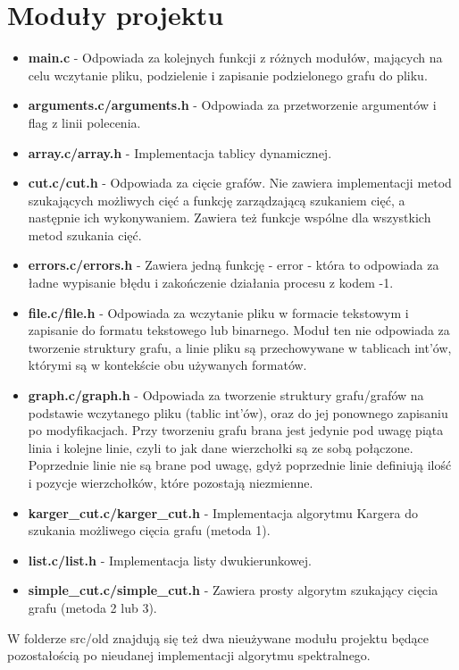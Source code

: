 \documentclass{article}
\begin{document}
\section{Moduły projektu}
\begin{itemize}
    \item \textbf{main.c} - Odpowiada za kolejnych funkcji z różnych modułów, mających na celu wczytanie pliku, podzielenie i zapisanie podzielonego grafu do pliku.
    \item \textbf{arguments.c/arguments.h} - Odpowiada za przetworzenie argumentów i flag z linii polecenia.
    \item \textbf{array.c/array.h} - Implementacja tablicy dynamicznej.
    \item \textbf{cut.c/cut.h} - Odpowiada za cięcie grafów. Nie zawiera implementacji metod szukających możliwych cięć a funkcję zarządzającą szukaniem cięć, a następnie ich wykonywaniem. Zawiera też funkcje wspólne dla wszystkich metod szukania cięć.
    \item \textbf{errors.c/errors.h} - Zawiera jedną funkcję - error - która to odpowiada za ładne wypisanie błędu i zakończenie działania procesu z kodem -1.
    \item \textbf{file.c/file.h} - Odpowiada za wczytanie pliku w formacie tekstowym i zapisanie do formatu tekstowego lub binarnego. Moduł ten nie odpowiada za tworzenie struktury grafu, a linie pliku są przechowywane w tablicach int'ów, którymi są w kontekście obu używanych formatów.
    \item \textbf{graph.c/graph.h} - Odpowiada za tworzenie struktury grafu/grafów na podstawie wczytanego pliku (tablic int'ów), oraz do jej ponownego zapisaniu po modyfikacjach. Przy tworzeniu grafu brana jest jedynie pod uwagę piąta linia i kolejne linie, czyli to jak dane wierzchołki są ze sobą połączone. Poprzednie linie nie są brane pod uwagę, gdyż poprzednie linie definiują ilość i pozycje wierzchołków, które pozostają niezmienne.
    \item \textbf{karger\_cut.c/karger\_cut.h} - Implementacja algorytmu Kargera do szukania możliwego cięcia grafu (metoda 1).
    \item \textbf{list.c/list.h} - Implementacja listy dwukierunkowej.
    \item \textbf{simple\_cut.c/simple\_cut.h} - Zawiera prosty algorytm szukający cięcia grafu (metoda 2 lub 3).
\end{itemize}
W folderze src/old znajdują się też dwa nieużywane modułu projektu będące pozostałością po nieudanej implementacji algorytmu spektralnego.
\end{document}
